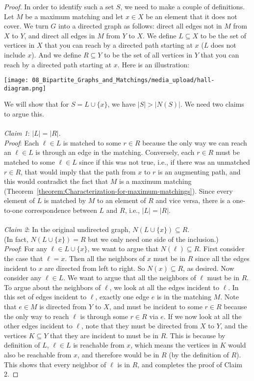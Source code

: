 \begin{flex}
\begin{proof}
In order to identify such a set $S$, we need to make a couple of definitions. Let $M$ be a maximum matching and let $x \in X$ be an element that it does not cover. We turn $G$ into a directed graph as follows: direct all edges not in $M$ from $X$ to $Y$, and direct all edges in $M$ from $Y$ to $X$. We define $L \subseteq X$ to be the set of vertices in $X$ that you can reach by a directed path starting at $x$ ($L$ does not include $x$). And we define $R \subseteq Y$ to be the set of all vertices in $Y$ that you can reach by a directed path starting at $x$. Here is an illustration:
\begin{center}
    \texttt{[image: 08\_Bipartite\_Graphs\_and\_Matchings/media\_upload/hall-diagram.png]}
\end{center} 
We will show that for $S = L \cup \{x\}$, we have $|S| > |N(S)|$. We need two claims to argue this.
\\\\
\noindent
\emph{Claim 1}: $|L| = |R|$. \\
\emph{Proof}: Each $\ell \in L$ is matched to some $r \in R$ because the only way we can reach an $\ell \in L$ is through an edge in the matching. Conversely, each $r \in R$ must be matched to some $\ell \in L$ since if this was not true, i.e., if there was an unmatched $r \in R$, that would imply that the path from $x$ to $r$ is an augmenting path, and this would contradict the fact that $M$ is a maximum matching (Theorem~\ref{theorem:Characterization-for-maximum-matchings}). Since every element of $L$ is matched by $M$ to an element of $R$ and vice versa, there is a one-to-one correspondence between $L$ and $R$, i.e., $|L| = |R|$. 
\\\\
\noindent
\emph{Claim 2}: In the original undirected graph, $N(L \cup \{x\}) \subseteq R$. \\
(In fact, $N(L \cup \{x\}) = R$ but we only need one side of the inclusion.) \\
\emph{Proof}: For any $\ell \in L \cup \{x\}$, we want to argue that $N(\ell) \subseteq R$. First consider the case that $\ell = x$. Then all the neighbors of $x$ must be in $R$ since all the edges incident to $x$ are directed from left to right. So $N(x) \subseteq R$, as desired. Now consider any $\ell \in L$. We want to argue that all the neighbors of $\ell$ must be in $R$. To argue about the neighbors of $\ell$, we look at all the edges incident to $\ell$. In this set of edges incident to $\ell$, exactly one edge $e$ is in the matching $M$. Note that $e \in M$ is directed from $Y$ to $X$, and must be incident to some $r \in R$ because the only way to reach $\ell$ is through some $r \in R$ via $e$. If we now look at all the other edges incident to $\ell$, note that they must be directed from $X$ to $Y$, and the vertices $K \subseteq Y$ that they are incident to must be in $R$. This is because by definition of $L$, $\ell \in L$ is reachable from $x$, which means the vertices in $K$ would also be reachable from $x$, and therefore would be in $R$ (by the definition of $R$). This shows that every neighbor of $\ell$ is in $R$, and completes the proof of Claim 2.


\end{proof}
\end{flex}
